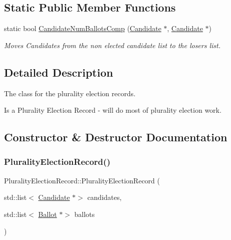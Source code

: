 \subsection*{Static Public Member Functions}
\begin{DoxyCompactItemize}
\item 
static bool \hyperlink{classPluralityElectionRecord_af7b9fef847ef615ff844912a1a851a62}{Candidate\+Num\+Ballots\+Comp} (\hyperlink{classCandidate}{Candidate} $\ast$, \hyperlink{classCandidate}{Candidate} $\ast$)
\begin{DoxyCompactList}\small\item\em Moves Candidates from the non elected candidate list to the losers list. \end{DoxyCompactList}\end{DoxyCompactItemize}


\subsection{Detailed Description}
The class for the plurality election records. 

Is a Plurality Election Record -\/ will do most of plurality election work. 

\subsection{Constructor \& Destructor Documentation}
\mbox{\label{classPluralityElectionRecord_a6cc4b921ebfed3f5003b3047fae68fc5}} 
\subsubsection{\texorpdfstring{Plurality\+Election\+Record()}{PluralityElectionRecord()}}
{\footnotesize\ttfamily Plurality\+Election\+Record\+::\+Plurality\+Election\+Record (\begin{DoxyParamCaption}\item[{std\+::list$<$ \hyperlink{classCandidate}{Candidate} $\ast$$>$}]{candidates,  }\item[{std\+::list$<$ \hyperlink{classBallot}{Ballot} $\ast$$>$}]{ballots }\end{DoxyParamCaption})\hspace{0.3cm}{\ttfamily [explicit]}}



